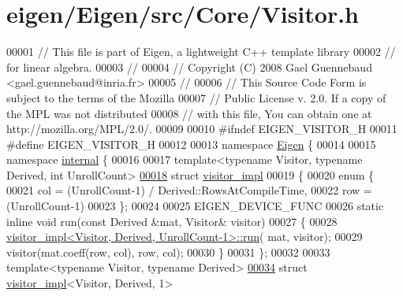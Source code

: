 \hypertarget{eigen_2_eigen_2src_2_core_2_visitor_8h_source}{}\section{eigen/\+Eigen/src/\+Core/\+Visitor.h}
\label{eigen_2_eigen_2src_2_core_2_visitor_8h_source}

\begin{DoxyCode}
00001 \textcolor{comment}{// This file is part of Eigen, a lightweight C++ template library}
00002 \textcolor{comment}{// for linear algebra.}
00003 \textcolor{comment}{//}
00004 \textcolor{comment}{// Copyright (C) 2008 Gael Guennebaud <gael.guennebaud@inria.fr>}
00005 \textcolor{comment}{//}
00006 \textcolor{comment}{// This Source Code Form is subject to the terms of the Mozilla}
00007 \textcolor{comment}{// Public License v. 2.0. If a copy of the MPL was not distributed}
00008 \textcolor{comment}{// with this file, You can obtain one at http://mozilla.org/MPL/2.0/.}
00009 
00010 \textcolor{preprocessor}{#ifndef EIGEN\_VISITOR\_H}
00011 \textcolor{preprocessor}{#define EIGEN\_VISITOR\_H}
00012 
00013 \textcolor{keyword}{namespace }\hyperlink{namespace_eigen}{Eigen} \{ 
00014 
00015 \textcolor{keyword}{namespace }\hyperlink{namespaceinternal}{internal} \{
00016 
00017 \textcolor{keyword}{template}<\textcolor{keyword}{typename} Visitor, \textcolor{keyword}{typename} Derived, \textcolor{keywordtype}{int} UnrollCount>
\hyperlink{struct_eigen_1_1internal_1_1visitor__impl}{00018} \textcolor{keyword}{struct }\hyperlink{struct_eigen_1_1internal_1_1visitor__impl}{visitor\_impl}
00019 \{
00020   \textcolor{keyword}{enum} \{
00021     col = (UnrollCount-1) / Derived::RowsAtCompileTime,
00022     row = (UnrollCount-1) %
00023   \};
00024 
00025   EIGEN\_DEVICE\_FUNC
00026   \textcolor{keyword}{static} \textcolor{keyword}{inline} \textcolor{keywordtype}{void} run(\textcolor{keyword}{const} Derived &mat, Visitor& visitor)
00027   \{
00028     \hyperlink{struct_eigen_1_1internal_1_1visitor__impl}{visitor\_impl<Visitor, Derived, UnrollCount-1>::run}(
      mat, visitor);
00029     visitor(mat.coeff(row, col), row, col);
00030   \}
00031 \};
00032 
00033 \textcolor{keyword}{template}<\textcolor{keyword}{typename} Visitor, \textcolor{keyword}{typename} Derived>
\hyperlink{struct_eigen_1_1internal_1_1visitor__impl_3_01_visitor_00_01_derived_00_011_01_4}{00034} \textcolor{keyword}{struct }\hyperlink{struct_eigen_1_1internal_1_1visitor__impl}{visitor\_impl}<Visitor, Derived, 1>

\end{DoxyCode}
